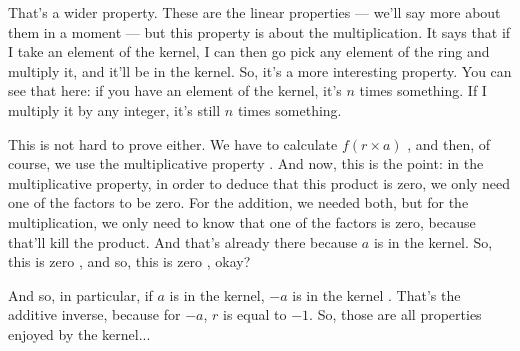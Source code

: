 \begin{speech}[00:34:49 - 00:36:11]
That's a wider property. These are the linear properties --- we'll say more about them in a moment --- but this property is about the multiplication. It says that if I take an element of the kernel, I can then go pick any element of the ring and multiply it, and it'll be in the kernel. So, it's a more interesting property. You can see that here: if you have an element of the kernel, it's $n$ times something. If I multiply it by any integer, it's still $n$ times something.

This is not hard to prove either. We have to calculate $f(r \times a)$ , and then, of course, we use the multiplicative property . And now, this is the point: in the multiplicative property, in order to deduce that this product is zero, we only need one of the factors to be zero. For the addition, we needed both, but for the multiplication, we only need to know that one of the factors is zero, because that'll kill the product. And that's already there because $a$ is in the kernel. So, this is zero , and so, this is zero , okay?

And so, in particular, if $a$ is in the kernel, $-a$ is in the kernel . That's the additive inverse, because for $-a$, $r$ is equal to $-1$. So, those are all properties enjoyed by the kernel...
\end{speech}

